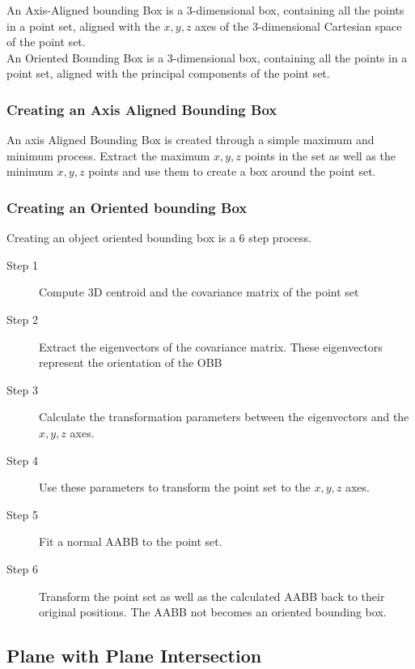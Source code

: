 		An Axis-Aligned bounding Box is a 3-dimensional box, containing all the points in a point set, aligned with the $x,y,z$ axes of the 3-dimensional Cartesian space of the point set.\\
		
		An Oriented Bounding Box is a 3-dimensional box, containing all the points in a point set, aligned with the principal components of the point set.
		
		\subsubsection{Creating an Axis Aligned Bounding Box}
			An axis Aligned Bounding Box is created through a simple maximum and minimum process.
			Extract the maximum $x,y,z$ points in the set as well as the minimum $x,y,z$ points and use them to create a box around the point set.
		
		\subsubsection{Creating an Oriented bounding Box}
			Creating an object oriented bounding box is a 6 step process.
			\begin{description}
				\item[Step 1] Compute 3D centroid and the covariance matrix of the point set
									
				\item[Step 2] Extract the eigenvectors of the covariance matrix. These eigenvectors represent the orientation of the OBB
				
				\item[Step 3] Calculate the transformation parameters between the eigenvectors and the $x,y,z$ axes.
				
				\item[Step 4] Use these parameters to transform the point set to the $x,y,z$ axes.
				
				\item[Step 5] Fit a normal AABB to the point set.
				
				\item[Step 6] Transform the point set as well as the calculated AABB back to their original positions. The AABB not becomes an oriented bounding box.
			\end{description}
			
	\subsection{Plane with Plane Intersection}
	
